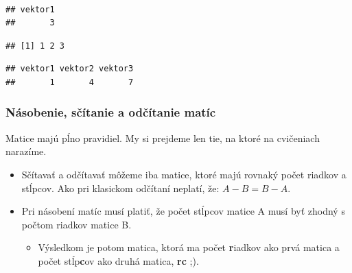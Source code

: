 ~

\begin{Shaded}
\begin{Highlighting}[]
\NormalTok{matica_riadky[}\NormalTok{, }\NormalTok{] }
\end{Highlighting}
\end{Shaded}

\begin{verbatim}
## vektor1 
##       3
\end{verbatim}

\begin{Shaded}
\begin{Highlighting}[]
\NormalTok{matica_riadky[}\NormalTok{, ] }
\end{Highlighting}
\end{Shaded}

\begin{verbatim}
## [1] 1 2 3
\end{verbatim}

\begin{Shaded}
\begin{Highlighting}[]
\NormalTok{matica_riadky[ , }\NormalTok{] }
\end{Highlighting}
\end{Shaded}

\begin{verbatim}
## vektor1 vektor2 vektor3 
##       1       4       7
\end{verbatim}

\hypertarget{nuxe1sobenie-sux10duxedtanie-a-odux10duxedtanie-matuxedc}{%
\subsubsection{Násobenie, sčítanie a odčítanie
matíc}\label{nuxe1sobenie-sux10duxedtanie-a-odux10duxedtanie-matuxedc}}

Matice majú pĺno pravidiel. My si prejdeme len tie, na ktoré na
cvičeniach narazíme.

\begin{itemize}
\tightlist
\item
  Sčítavať a odčítavať môžeme iba matice, ktoré majú rovnaký počet
  riadkov a stĺpcov. Ako pri klasickom odčítaní neplatí, že:
  \(A - B = B - A\).
\item
  Pri násobení matíc musí platiť, že počet stĺpcov matice A musí byť
  zhodný s počtom riadkov matice B.

  \begin{itemize}
  \tightlist
  \item
    Výsledkom je potom matica, ktorá ma počet \textbf{r}iadkov ako prvá
    matica a počet stĺp\textbf{c}ov ako druhá matica, \textbf{rc} ;).
  \end{itemize}
\end{itemize}

